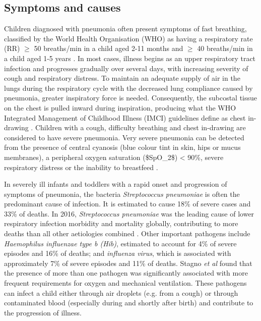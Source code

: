 \subsection{Symptoms and causes}

Children diagnosed with pneumonia often present symptoms of fast breathing, classified by the World Health Organisation (WHO) as having a respiratory rate (RR) $\geq$
50 breaths/min in a child aged 2-11 months and $\geq$ 40 breaths/min in a child aged 1-5 years \cite{world2013pocket}. In most cases, illness begins as an upper respiratory tract infection and progresses gradually over several days, with increasing severity of cough and respiratory distress. To maintain an adequate supply of air in the lungs during the respiratory cycle with the decreased lung compliance caused by pneumonia, greater inspiratory force is needed. Consequently, the subcostal tissue on the chest is pulled inward during inspiration, producing what the WHO Integrated Management of Childhood Illness (IMCI) guidelines define as chest in-drawing \cite{mccollum2017outpatient}. Children with a cough, difficulty breathing and chest in-drawing are considered to have severe pneumonia. Very severe pneumonia can be detected from the presence of central cyanosis (blue colour tint in skin, hips or mucus membranes), a peripheral oxygen saturation (\gls{$SpO_2$}) < 90\%, severe respiratory distress or the inability to breastfeed  \cite{ayieko2007case}. 

In severely ill infants and toddlers with a rapid onset and progression of symptoms of pneumonia, the bacteria \textit{Streptococcus pneumoniae} is often the predominant cause of infection. It is estimated to cause 18\% of severe cases and 33\% of deaths. In 2016, \textit{Streptococcus pneumoniae} was the leading cause of lower respiratory infection morbidity and mortality globally, contributing to more deaths than all other aetiologies combined \cite{troeger2018estimates}. Other important pathogens include \textit{Haemophilus influenzae type b (Hib)}, estimated to account for 4\% of severe episodes and 16\% of deaths; and \textit{influenza virus}, which is associated with approximately 7\% of severe episodes and 11\% of deaths. Stagno \textit{et al} \cite{stagno1981infant} found that the presence of more than one pathogen was significantly associated with more frequent requirements for oxygen and mechanical ventilation. These pathogens can infect a child either through air droplets (e.g. from a cough) or through contaminated blood (especially during and shortly after birth) and contribute to the progression of illness.
 
